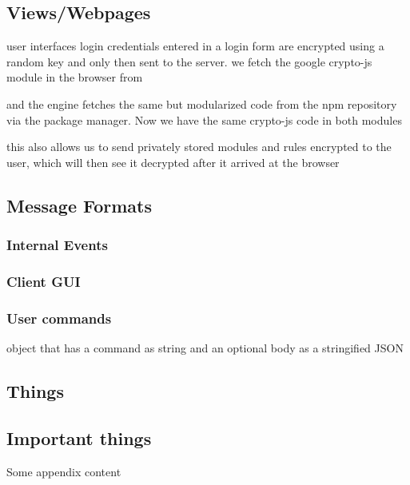 \documentclass{article}
\begin{document}
\subsection{Views/Webpages}
user interfaces
login
credentials entered in a login form are encrypted using a random key and only then sent to the server.
we fetch the google crypto-js module in the browser from

and the engine fetches the same but modularized code from the npm repository via the package manager. Now we have the same crypto-js code in both modules

this also allows us to send privately stored modules and rules encrypted to the user, which will then see it decrypted after it arrived at the browser

\subsection{Message Formats}
\subsubsection{Internal Events}
\subsubsection{Client GUI}


\subsubsection{User commands}
object that has a command as string and an optional body as a stringified JSON





\newpage
\renewcommand*\appendixpagename{APPENDIX}
\renewcommand*\appendixtocname{APPENDIX}
\begin{appendices}
 \section{Things}
   \subsection{Important things}
 Some appendix content
 
\end{appendices}
\end{document}
